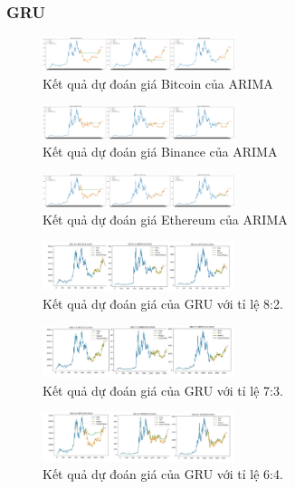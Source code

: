 \documentclass[conference]{IEEEtran}
\begin{document}
\subsubsection{GRU}
\begin{figure}[H]
    \centering
    \includegraphics[width=0.5\textwidth]{bibliography/Figure/ARIMA_BTC_90.png}
    \caption{Kết quả dự đoán giá Bitcoin của ARIMA}
\end{figure}
\begin{figure}[H]
    \centering
    \includegraphics[width=0.5\textwidth]{bibliography/Figure/ARIMA_BNB_90.png}
    \caption{Kết quả dự đoán giá Binance của ARIMA}
\end{figure}
\begin{figure}[H]
    \centering
    \includegraphics[width=0.5\textwidth]{bibliography/Figure/ARIMA_ETH_90.png}
    \caption{Kết quả dự đoán giá Ethereum của ARIMA}
\end{figure}

\begin{figure}[H]
    \centering
    \includegraphics[width=0.5\textwidth]{bibliography/pictures/GRU_82.jpg}
    \caption{Kết quả dự đoán giá của GRU với tỉ lệ 8:2.}
\end{figure}
\begin{figure}[H]
    \centering
    \includegraphics[width=0.5\textwidth]{bibliography/pictures/GRU_73.jpg}
    \caption{Kết quả dự đoán giá của GRU với tỉ lệ 7:3.}
\end{figure}
\begin{figure}[H]
    \centering
    \includegraphics[width=0.5\textwidth]{bibliography/pictures/GRU_64.jpg}
    \caption{Kết quả dự đoán giá của GRU với tỉ lệ 6:4.}
\end{figure}
\end{document}
